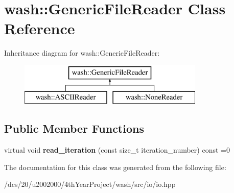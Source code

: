 \hypertarget{classwash_1_1GenericFileReader}{}\section{wash\+:\+:Generic\+File\+Reader Class Reference}
\label{classwash_1_1GenericFileReader}
Inheritance diagram for wash\+:\+:Generic\+File\+Reader\+:\begin{figure}[H]
\begin{center}
\leavevmode
\includegraphics[height=2.000000cm]{classwash_1_1GenericFileReader}
\end{center}
\end{figure}
\subsection*{Public Member Functions}
\begin{DoxyCompactItemize}
\item 
\mbox{\label{classwash_1_1GenericFileReader_a4be5668152706252a4d5759568cf4062}} 
virtual void {\bfseries read\+\_\+iteration} (const size\+\_\+t iteration\+\_\+number) const =0
\end{DoxyCompactItemize}


The documentation for this class was generated from the following file\+:\begin{DoxyCompactItemize}
\item 
/dcs/20/u2002000/4th\+Year\+Project/wash/src/io/io.\+hpp\end{DoxyCompactItemize}

